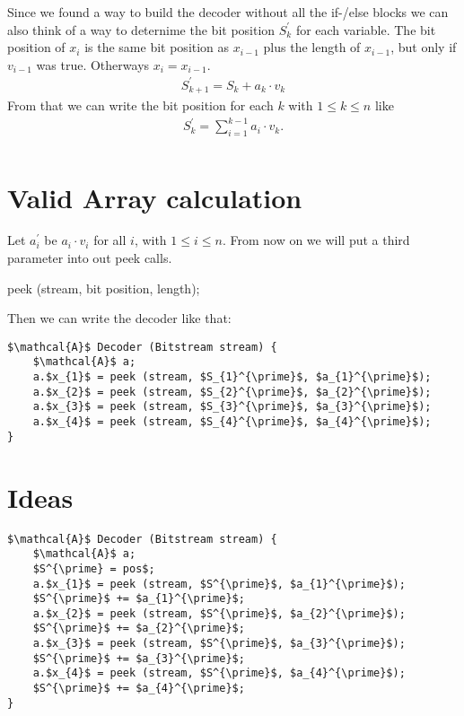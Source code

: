 \documentclass[parskip=half,paper=a4,DIV=13]{scrartcl}
\begin{document}
Since we found a way to build the decoder without all the if-/else blocks we can also think of a way to deternime the bit position $S_{k}^{\prime}$ for each variable.
The bit position of $x_{i}$ is the same bit position as $x_{i-1}$ plus the length of $x_{i-1}$, but only if $v_{i-1}$ was true.
Otherways $x_{i} = x_{i-1}$.
\begin{align*}
	S_{k+1}^{\prime} = S_{k} + a_{k} \cdot v_{k}
\end{align*}
From that we can write the bit position for each $k$ with $1 \leq k \leq n$ like
\begin{align*}
	S_{k}^{\prime} = \sum_{i=1}^{k-1} a_{i} \cdot v_{k}.\\
\end{align*}

\section{Valid Array calculation}

Let $a_{i}^{\prime}$ be $a_{i}\cdot v_{i}$ for all $i$, with $1 \leq i \leq n$. From now on we will put a third parameter into out peek calls.
\begin{center}
	peek (stream, bit position, length);
\end{center}
Then we can write the decoder like that:
\begin{lstlisting}[mathescape]
$\mathcal{A}$ Decoder (Bitstream stream) {
	$\mathcal{A}$ a;
	a.$x_{1}$ = peek (stream, $S_{1}^{\prime}$, $a_{1}^{\prime}$);
	a.$x_{2}$ = peek (stream, $S_{2}^{\prime}$, $a_{2}^{\prime}$);
	a.$x_{3}$ = peek (stream, $S_{3}^{\prime}$, $a_{3}^{\prime}$);
	a.$x_{4}$ = peek (stream, $S_{4}^{\prime}$, $a_{4}^{\prime}$);
}
\end{lstlisting}

\section{Ideas}

\begin{lstlisting}[mathescape]
$\mathcal{A}$ Decoder (Bitstream stream) {
	$\mathcal{A}$ a;
	$S^{\prime} = pos$;
	a.$x_{1}$ = peek (stream, $S^{\prime}$, $a_{1}^{\prime}$);
	$S^{\prime}$ += $a_{1}^{\prime}$;
	a.$x_{2}$ = peek (stream, $S^{\prime}$, $a_{2}^{\prime}$);
	$S^{\prime}$ += $a_{2}^{\prime}$;
	a.$x_{3}$ = peek (stream, $S^{\prime}$, $a_{3}^{\prime}$);
	$S^{\prime}$ += $a_{3}^{\prime}$;
	a.$x_{4}$ = peek (stream, $S^{\prime}$, $a_{4}^{\prime}$);
	$S^{\prime}$ += $a_{4}^{\prime}$;
}
\end{lstlisting}
\end{document}
